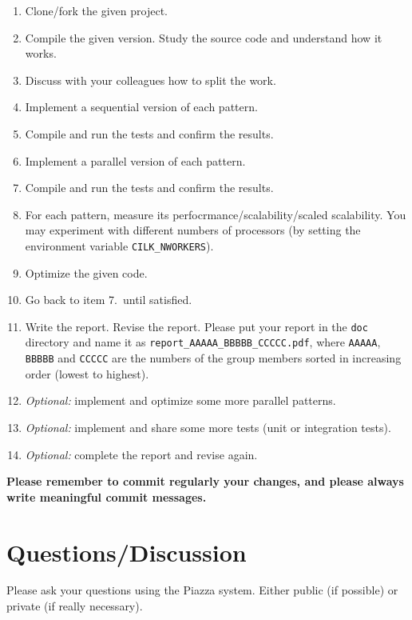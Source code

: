 \documentclass[11pt]{article}
\begin{document}
\begin{enumerate}
  \item Clone/fork the given project.
  \item Compile the given version.  Study the source code and understand how it works.
  \item Discuss with your colleagues how to split the work.
  \item Implement a sequential version of each pattern.
  \item Compile and run the tests and confirm the results.
  \item Implement a parallel version of each pattern.
  \item Compile and run the tests and confirm the results.
  \item For each pattern, measure its perfocrmance/scalability/scaled scalability. You may experiment with different numbers of processors (by setting the environment variable \verb!CILK_NWORKERS!). 
  \item Optimize the given code.
  \item Go back to item 7.\ until satisfied.
  \item Write the report.  Revise the report.  Please put your report in the \verb!doc! directory and name it as \verb!report_AAAAA_BBBBB_CCCCC.pdf!, where \verb!AAAAA!,  \verb!BBBBB! and  \verb!CCCCC! are the numbers of the group members sorted in increasing order (lowest to highest).
  \item \emph{Optional:} implement and optimize some more parallel patterns.
  \item \emph{Optional:} implement and share some more tests (unit or integration tests).
  \item \emph{Optional:} complete the report and revise again.
\end{enumerate}

\textbf{Please remember to commit regularly your changes, and please always write meaningful commit messages.}



\section{Questions/Discussion}

Please ask your questions using the Piazza system.  Either public (if possible) or private (if really necessary).
\end{document}
